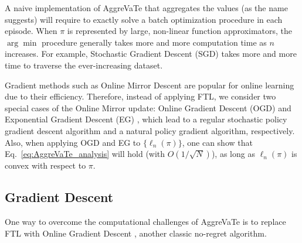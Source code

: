 \documentclass{article}
\newcommand{\drew}[1]{\textcolor{blue}{\bf Drew: {#1}}}
\newcommand{\todo}{\textcolor{red}{\textbf{[TODO]}}}
\begin{document}
A naive implementation of AggreVaTe that aggregates the values (as the name suggests) will require to exactly solve a batch optimization procedure in each episode. 
When $\pi$ is represented by large, non-linear function approximators, the $\arg\min$ procedure generally takes more and more computation time as $n$ increases. For example, Stochastic Gradient Descent (SGD) takes more and more time to traverse the ever-increasing dataset. 


Gradient methods such as Online Mirror Descent \cite{shalev2012online} are popular for online learning due to their efficiency. Therefore, instead of applying FTL, we consider two special cases of the Online Mirror update: Online Gradient Descent (OGD) \cite{Zinkevich2003_ICML}  and Exponential Gradient Descent (EG) \cite{shalev2012online}, which lead to a regular stochastic policy gradient descent algorithm and a natural policy gradient algorithm, respectively. Also, when applying OGD and EG to $\{\ell_n(\pi)\}$, one can show that Eq.~\ref{eq:AggreVaTe_analysis} will hold (with $O(1/\sqrt{N})$), as long as $\ell_n(\pi)$ is convex with respect to $\pi$. 



\subsection{Gradient Descent}
One way to overcome the computational challenges of AggreVaTe is to replace FTL with Online Gradient Descent \cite{Zinkevich2003_ICML}, another classic no-regret  algorithm. %
\end{document}
